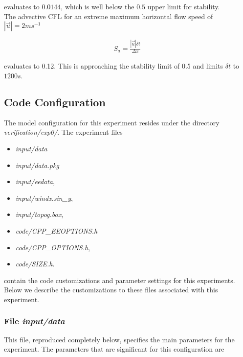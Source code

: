 \noindent evaluates to $0.0144$, which is well below the $0.5$ upper 
limit for stability.
\\

\noindent The advective CFL \cite{adcroft:95} for an extreme maximum 
horizontal flow speed of $ | \vec{u} | = 2 ms^{-1}$

\begin{eqnarray}
\label{EQ:eg-baro-cfl_stability}
S_{a} = \frac{| \vec{u} | \delta t}{ \Delta x}
\end{eqnarray}

\noindent evaluates to 0.12. This is approaching the stability limit
of 0.5 and limits $\delta t$ to $1200s$.

\subsection{Code Configuration}
\label{www:tutorials}
\label{SEC:eg-baro-code_config}

The model configuration for this experiment resides under the 
directory {\it verification/exp0/}.  The experiment files 
\begin{itemize}
\item {\it input/data}
\item {\it input/data.pkg}
\item {\it input/eedata},
\item {\it input/windx.sin\_y},
\item {\it input/topog.box},
\item {\it code/CPP\_EEOPTIONS.h}
\item {\it code/CPP\_OPTIONS.h},
\item {\it code/SIZE.h}. 
\end{itemize}
contain the code customizations and parameter settings for this 
experiments. Below we describe the customizations
to these files associated with this experiment.

\subsubsection{File {\it input/data}}
\label{www:tutorials}

This file, reproduced completely below, specifies the main parameters 
for the experiment. The parameters that are significant for this configuration
are

